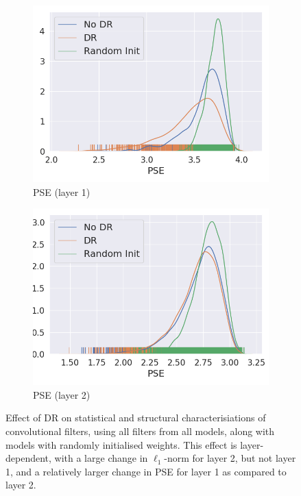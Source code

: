 \begin{figure}
\begin{subfigure}{0.24\textwidth}
    \includegraphics[width=\textwidth]{figures/chapter6/weightdistributions/conv1_se}
    \caption{PSE (layer 1)}
  \end{subfigure}
  \begin{subfigure}{0.24\textwidth}
    \includegraphics[width=\textwidth]{figures/chapter6/weightdistributions/conv2_se}
    \caption{PSE (layer 2)}
  \end{subfigure}
  \caption{Effect of DR on statistical and structural characterisiations of convolutional filters, using all filters from all models, along with models with randomly initialised weights. This effect is layer-dependent, with a large change in $\ell_1$-norm for layer 2, but not layer 1, and a relatively larger change in PSE for layer 1 as compared to layer 2.}
  \label{fig:norms_entropy}
\end{figure}

